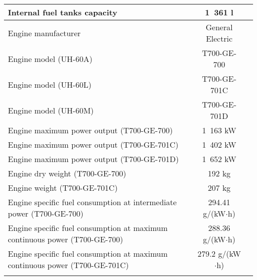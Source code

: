\begin{tabularx}{\textwidth}{ | L | c | c | }
  Internal fuel tanks capacity          & 1~361 l          & \cite{Janes20042005,UH60_OperatorsManual} \\ \hline
  Engine manufacturer                   & General Electric & \cite{Janes20042005} \\ \hline
  Engine model (UH-60A)                 & T700-GE-700      & \cite{Janes20042005,UH60_OperatorsManual} \\ \hline
  Engine model (UH-60L)                 & T700-GE-701C     & \cite{Janes20042005,UH60_OperatorsManual} \\ \hline
  Engine model (UH-60M)                 & T700-GE-701D     & \cite{Janes20042005} \\ \hline
  Engine maximum power output (T700-GE-700)  & 1~163 kW    & \cite{Janes20042005,Janes19841985} \\ \hline
  Engine maximum power output (T700-GE-701C) & 1~402 kW    & \cite{Janes20042005} \\ \hline
  Engine maximum power output (T700-GE-701D) & 1~652 kW    & \cite{Janes20042005} \\ \hline
  Engine dry weight (T700-GE-700)       & 192 kg           & \cite{Janes19841985} \\ \hline
  Engine weight (T700-GE-701C)          & 207 kg           & \cite{UH60_GE_T700_DataSheet} \\ \hline
  Engine specific fuel consumption at intermediate power (T700-GE-700) & 294.41 g/(kW$\cdot$h) & \cite{Janes19841985} \\ \hline
  Engine specific fuel consumption at maximum continuous power (T700-GE-700) & 288.36 g/(kW$\cdot$h) & \cite{Janes19841985} \\ \hline
  Engine specific fuel consumption at maximum continuous power (T700-GE-701C) & 279.2 g/(kW$\cdot$h) & \cite{UH60_GE_T700_DataSheet} \\ \hline
  \caption{Basic data}
\end{tabularx}
